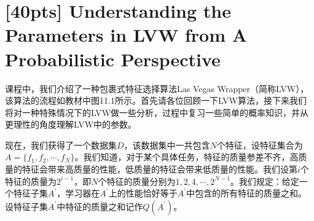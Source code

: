 \documentclass[a4paper,UTF8]{article}
\numberwithin{equation}{section}
\begin{document}
\section{\textbf{[40pts]} Understanding the Parameters in LVW from A Probabilistic Perspective}
课程中，我们介绍了一种包裹式特征选择算法Las Vegas Wrapper（简称LVW），该算法的流程如教材中图11.1所示。首先请各位回顾一下LVW算法，接下来我们将对一种特殊情况下的LVW做一些分析，过程中复习一些简单的概率知识，并从更理性的角度理解LVW中的参数。

现在，我们获得了一个数据集$D$，该数据集中一共包含$N$个特征，设特征集合为$A=\{f_1,f_2,\cdots,f_N\}$。我们知道，对于某个具体任务，特征的质量参差不齐，高质量的特征会带来高质量的性能，低质量的特征会带来低质量的性能。我们设第$i$个特征的质量为$2^{i-1}$，即$N$个特征的质量分别为$1,2,4,\cdots,2^{N-1}$。我们规定：给定一个特征子集$A^\prime$，学习器在$A^\prime$上的性能恰好等于$A^\prime$中包含的所有特征的质量之和。设特征子集$A^\prime$中特征的质量之和记作$Q(A^\prime)$。
\end{document}
